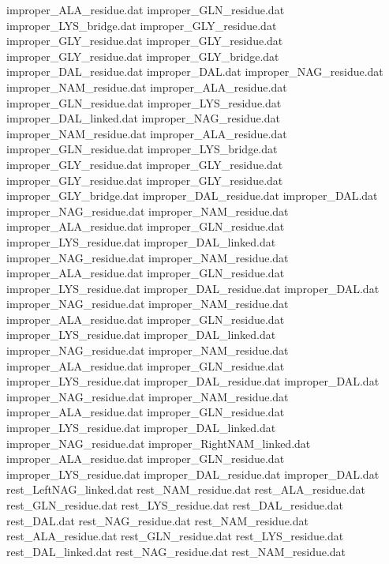 improper_ALA_residue.dat        
improper_GLN_residue.dat        
improper_LYS_bridge.dat         
improper_GLY_residue.dat
improper_GLY_residue.dat
improper_GLY_residue.dat
improper_GLY_residue.dat
improper_GLY_bridge.dat
improper_DAL_residue.dat        
improper_DAL.dat                
improper_NAG_residue.dat        
improper_NAM_residue.dat        
improper_ALA_residue.dat        
improper_GLN_residue.dat        
improper_LYS_residue.dat        
improper_DAL_linked.dat         
improper_NAG_residue.dat        
improper_NAM_residue.dat        
improper_ALA_residue.dat        
improper_GLN_residue.dat        
improper_LYS_bridge.dat         
improper_GLY_residue.dat
improper_GLY_residue.dat
improper_GLY_residue.dat
improper_GLY_residue.dat
improper_GLY_bridge.dat
improper_DAL_residue.dat        
improper_DAL.dat                
improper_NAG_residue.dat        
improper_NAM_residue.dat        
improper_ALA_residue.dat        
improper_GLN_residue.dat        
improper_LYS_residue.dat        
improper_DAL_linked.dat         
improper_NAG_residue.dat        
improper_NAM_residue.dat        
improper_ALA_residue.dat        
improper_GLN_residue.dat        
improper_LYS_residue.dat        
improper_DAL_residue.dat        
improper_DAL.dat                
improper_NAG_residue.dat        
improper_NAM_residue.dat        
improper_ALA_residue.dat        
improper_GLN_residue.dat        
improper_LYS_residue.dat        
improper_DAL_linked.dat         
improper_NAG_residue.dat        
improper_NAM_residue.dat        
improper_ALA_residue.dat        
improper_GLN_residue.dat        
improper_LYS_residue.dat        
improper_DAL_residue.dat        
improper_DAL.dat                
improper_NAG_residue.dat        
improper_NAM_residue.dat        
improper_ALA_residue.dat        
improper_GLN_residue.dat        
improper_LYS_residue.dat        
improper_DAL_linked.dat         
improper_NAG_residue.dat        
improper_RightNAM_linked.dat    
improper_ALA_residue.dat        
improper_GLN_residue.dat        
improper_LYS_residue.dat        
improper_DAL_residue.dat        
improper_DAL.dat                
rest_LeftNAG_linked.dat         
rest_NAM_residue.dat            
rest_ALA_residue.dat            
rest_GLN_residue.dat            
rest_LYS_residue.dat            
rest_DAL_residue.dat            
rest_DAL.dat                    
rest_NAG_residue.dat            
rest_NAM_residue.dat            
rest_ALA_residue.dat            
rest_GLN_residue.dat            
rest_LYS_residue.dat            
rest_DAL_linked.dat             
rest_NAG_residue.dat            
rest_NAM_residue.dat            
